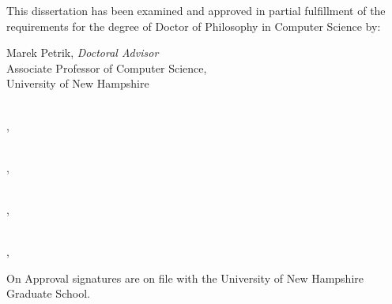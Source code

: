 \newcommand{\committeemember}[3]{%
  \par\noindent\hspace*{0.3\textwidth}\parbox[t]{0.7\textwidth}{#1\\ #2\\ #3}\par\vspace{2em}}

\noindent This dissertation has been examined and approved in partial fulfillment of the requirements for the degree of Doctor of Philosophy in Computer Science by:

\vfill
\begingroup
\singlespacing
\committeemember{Marek Petrik, \emph{Doctoral Advisor}}{Associate Professor of Computer Science,}{University of New Hampshire}
\committeemember{}{,}{}
\committeemember{}{,}{}
\committeemember{}{,}{}
\committeemember{}{\todo{title},}{\todo{affiliation}}
\endgroup
\vfill
\hfill On 
\vfill
\noindent Approval signatures are on file with the University of New Hampshire Graduate School.
\clearpage
